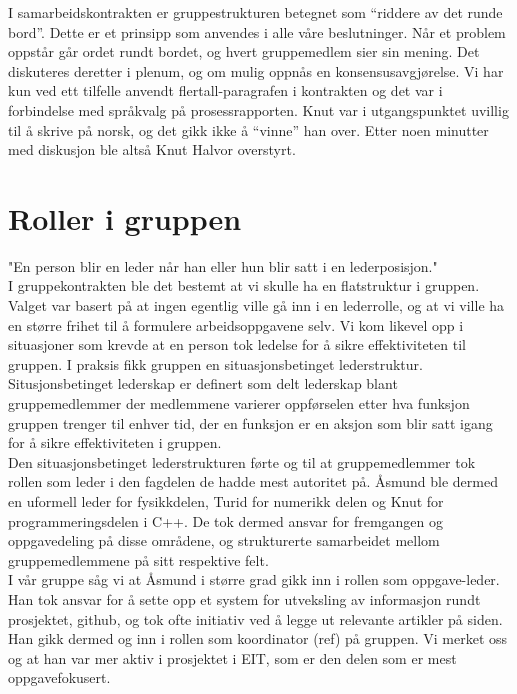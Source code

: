 I samarbeidskontrakten er gruppestrukturen betegnet som ``riddere av det runde
bord''. Dette er et prinsipp som anvendes i alle våre beslutninger. Når et
problem oppstår går ordet rundt bordet, og hvert gruppemedlem sier sin mening.
Det diskuteres deretter i plenum, og om mulig oppnås en konsensusavgjørelse. Vi
har kun ved ett tilfelle anvendt flertall-paragrafen i kontrakten og det var i
forbindelse med språkvalg på prosessrapporten. Knut var i utgangspunktet uvillig
til å skrive på norsk, og det gikk ikke å ``vinne'' han over. Etter noen
minutter med diskusjon ble altså Knut Halvor overstyrt.

\section{Roller i gruppen}
"En person blir en leder når han eller hun blir satt i en lederposisjon."\\

I gruppekontrakten ble det bestemt at vi skulle ha en flatstruktur i gruppen. Valget 
var basert på at ingen egentlig ville gå inn i en lederrolle, og at vi ville ha en 
større frihet til å formulere arbeidsoppgavene selv. Vi kom likevel opp i situasjoner
som krevde at en person tok ledelse for å sikre effektiviteten til gruppen. I praksis 
fikk gruppen en situasjonsbetinget lederstruktur. Situsjonsbetinget lederskap er definert
som delt lederskap blant gruppemedlemmer der medlemmene varierer oppførselen etter hva
funksjon gruppen trenger til enhver tid, der en funksjon er en aksjon som blir satt 
igang for å sikre effektiviteten i gruppen.\\

Den situasjonsbetinget lederstrukturen førte og til at gruppemedlemmer tok rollen som 
leder i den fagdelen de hadde mest autoritet på. Åsmund ble dermed en uformell leder 
for fysikkdelen, Turid for numerikk delen og Knut for programmeringsdelen i C++. De 
tok dermed ansvar for fremgangen og oppgavedeling på disse områdene, og strukturerte 
samarbeidet mellom gruppemedlemmene på sitt respektive felt. \\

I vår gruppe såg vi at Åsmund i større grad gikk inn i rollen som oppgave-leder. Han 
tok ansvar for å sette opp et system for utveksling av informasjon rundt prosjektet, 
github, og tok ofte initiativ ved å legge ut relevante artikler på siden. Han gikk 
dermed og inn i rollen som koordinator (ref) på gruppen. Vi merket oss og at han var 
mer aktiv i prosjektet i EIT, som er den delen som er mest oppgavefokusert. \\

